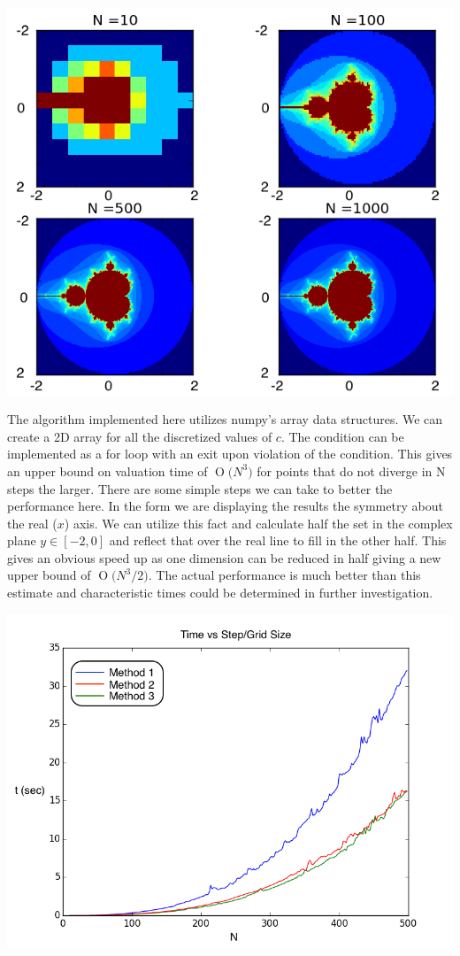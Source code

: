 \documentclass[12pt]{article}
\newcommand{\BigO}[1]{\ensuremath{\operatorname{O}\bigl(#1\bigr)}}
\begin{document}
\includegraphics{rv_color_log_fourplot.png}

The algorithm implemented here utilizes numpy's array data structures.  We can create a 2D array for all the discretized values of $c$.  The condition can be implemented as a for loop with an exit upon violation of the condition.  This gives an upper bound on valuation time of $\BigO{N^3}$ for points that do not diverge in N steps the larger.  There are some simple steps we can take to better the performance here.  In the form we are displaying the results the symmetry about the real ($x$) axis. We can utilize this fact and calculate half the set in the complex plane $y \in [-2,0]$ and reflect that over the real line to fill in the other half.  This gives an obvious speed up as one dimension can be reduced in half giving a new upper bound of $\BigO{N^3/2}$.  The actual performance is much better than this estimate and characteristic times could be determined in further investigation.
  
\includegraphics[scale=.8]{time_dep.png}
\end{document}
